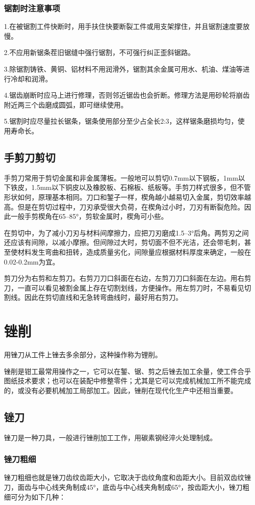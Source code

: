 \documentclass{ctexbook}
\begin{document}
\subsubsection{锯割时注意事项}
1.在被锯割工件快断时，用手扶住快要断裂工件或用支架撑住，并且锯割速度要放慢。

2.不应用新锯条茬旧锯缝中强行锯割，不可强行纠正歪斜锯路。

3.除锯割铸铁、黄铜、铝材料不用润滑外，锯割其余金属可用水、机油、煤油等进行冷却和润滑。

4.锯齿崩断时应马上进行修理，否则邻近锯齿也会折断。修理方法是用砂轮将崩齿附近两三个齿磨成圆弧，即可继续使用。

5.锯割时应尽量拉长锯条，锯条使用部分至少占全长2:3，这样锯条磨损均匀，使用寿命长。
\subsection{手剪刀剪切}
手剪刀常用于剪切金属和非金属薄板。一般地可以剪切0.7mm以下钢板，1mm以下铁皮，1.5mm以下铜皮以及橡胶板、石棉板、纸板等。手剪刀样式很多，但不管形状如何，原理基本相同。刀口和錾子一样，楔角越小越易切入金属，剪切效率越高。但是在剪切过程中，刀刃承受很大负荷，在楔角过小时，刀刃有断裂危险。因此一般手剪楔角在65--85°，剪软金属时，楔角可小些。

在剪切中，为了减小刀刃与材料间摩擦力，应把刀刃磨成1.5--3°后角。两剪刃之间还应该有间隙，以减小摩擦。但间隙过大时，剪切面不但不光洁，还会带毛刺，甚至使材料发生弯曲和扭转，造成质量劣化，间隙量应根据材料厚度来确定，一般在0.02-0.2mm为宜。

剪刀分为右剪和左剪刀。右剪刀刀口斜面在右边，左剪刀刀口斜面在左边。用右剪刀，一直可以看见被割金属上存在切割划线，方便操作。用左剪刀时，不易看见切割线。因此在剪切直线和无急转弯曲线时，最好用右剪刀。
\section{锉削}
用锉刀从工件上锉去多余部分，这种操作称为锂削。

锉削是钳工最常用操作之一，它可以在錾、锯、剪之后锉去加工余量，使工件合乎图纸技术要求；也可以在装配中修整零件；尤其是它可以完成机械加工所不能完成的，或没有必要机械加工局部加工。因此，锉削在现代化生产中还相当重要。
\subsection{锉刀}
锉刀是一种刀具，一般进行锉削加工工作，用碳素钢经淬火处理制成。
\subsubsection{锉刀粗细}
锉刀粗细也就是锉刀齿纹齿距大小，它取决于齿纹角度和齿距大小。目前双齿纹锉刀，面齿与中心线夹角制成45°，底齿与中心线夹角制成65°，按齿距大小，锉刀粗细可分为如下几种：
\end{document}
